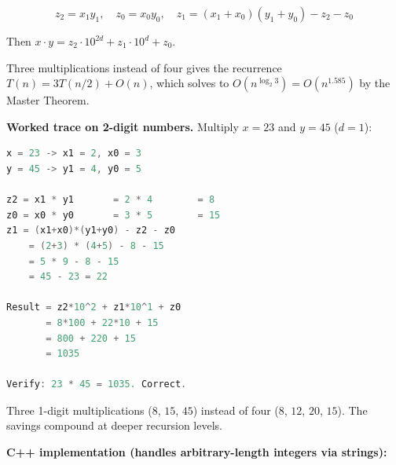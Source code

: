 \[
z_2 = x_1 y_1, \quad z_0 = x_0 y_0, \quad z_1 = (x_1 + x_0)(y_1 + y_0) - z_2 - z_0
\]

Then $x \cdot y = z_2 \cdot 10^{2d} + z_1 \cdot 10^{d} + z_0$.

Three multiplications instead of four gives the recurrence $T(n) = 3T(n/2) + O(n)$, which solves to $O(n^{\log_2 3}) = O(n^{1.585})$ by the Master Theorem.

\textbf{Worked trace on 2-digit numbers.} Multiply $x = 23$ and $y = 45$ ($d = 1$):

\begin{lstlisting}[language=C++]
x = 23 -> x1 = 2, x0 = 3
y = 45 -> y1 = 4, y0 = 5

z2 = x1 * y1       = 2 * 4        = 8
z0 = x0 * y0       = 3 * 5        = 15
z1 = (x1+x0)*(y1+y0) - z2 - z0
    = (2+3) * (4+5) - 8 - 15
    = 5 * 9 - 8 - 15
    = 45 - 23 = 22

Result = z2*10^2 + z1*10^1 + z0
       = 8*100 + 22*10 + 15
       = 800 + 220 + 15
       = 1035

Verify: 23 * 45 = 1035. Correct.
\end{lstlisting}

Three 1-digit multiplications ($8$, $15$, $45$) instead of four ($8$, $12$, $20$, $15$). The savings compound at deeper recursion levels.

\textbf{C++ implementation (handles arbitrary-length integers via strings):}

